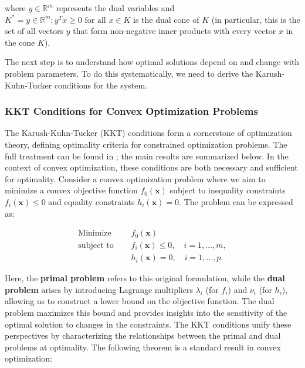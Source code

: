 \documentclass{article}
\begin{document}
where $y \in \mathbb{R}^m$ represents the dual variables and $K^* = {y \in \mathbb{R}^m : y^T x \geq 0 \text{ for all } x \in K}$ is the dual cone of $K$ (in particular, this is the set of all vectors \( y \) that form non-negative inner products with every vector \( x \) in the cone \( K \)). 

The next step is to understand how optimal solutions depend on and change with problem parameters. To do this systematically, we need to derive the Karush-Kuhn-Tucker conditions for the system. 

\subsubsection{KKT Conditions for Convex Optimization Problems}

The Karush-Kuhn-Tucker (KKT) conditions form a cornerstone of optimization theory, defining optimality criteria for constrained optimization problems. The full treatment can be found in \citet{boyd2004convex}; the main results are summarized below. In the context of convex optimization, these conditions are both necessary and sufficient for optimality. Consider a convex optimization problem where we aim to minimize a convex objective function $f_0(\mathbf{x})$ subject to inequality constraints $f_i(\mathbf{x}) \leq 0$ and equality constraints $h_i(\mathbf{x}) = 0$. The problem can be expressed as:

\begin{align*}
    \text{Minimize } & \quad f_0(\mathbf{x}) \\
    \text{subject to } & \quad f_i(\mathbf{x}) \leq 0, \quad i = 1, \dots, m, \\
    & \quad h_i(\mathbf{x}) = 0, \quad i = 1, \dots, p.
\end{align*}

Here, the \textbf{primal problem} refers to this original formulation, while the \textbf{dual problem} arises by introducing Lagrange multipliers $\lambda_i$ (for $f_i$) and $\nu_i$ (for $h_i$), allowing us to construct a lower bound on the objective function. The dual problem maximizes this bound and provides insights into the sensitivity of the optimal solution to changes in the constraints. The KKT conditions unify these perspectives by characterizing the relationships between the primal and dual problems at optimality. The following theorem is a standard result in convex optimization:
\end{document}
